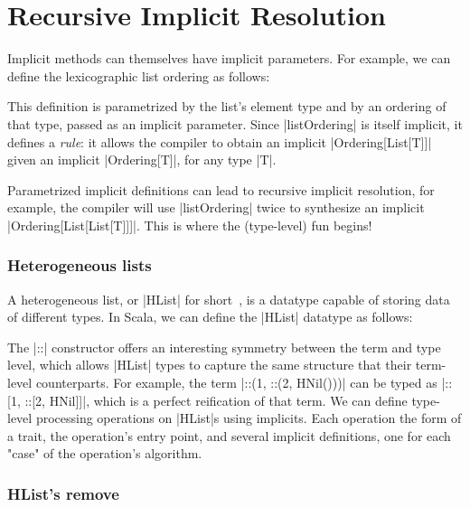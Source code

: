 \section{Recursive Implicit Resolution}

Implicit methods can themselves have implicit parameters.
For example, we can define the lexicographic list ordering as follows:

\ordListExample

\noindent
This definition is parametrized by the list's element type and by an ordering of that type, passed as an implicit parameter.
Since |listOrdering| is itself implicit, it defines a \emph{rule}: it allows the compiler to obtain an implicit |Ordering[List[T]]| given an implicit |Ordering[T]|, for any type |T|.

Parametrized implicit definitions can lead to recursive implicit resolution, for example, the compiler will use |listOrdering| twice to synthesize an implicit |Ordering[List[List[T]]]|.
This is where the (type-level) fun begins!

\subsubsection{Heterogeneous lists}

A heterogeneous list, or |HList| for short~\citep{kiselyov2004strongly}, is a datatype capable of storing data of different types.
In Scala, we can define the |HList| datatype as follows:

\hlistEnumDefinition


\noindent
The |::| constructor offers an interesting symmetry between the term and type level, which allows |HList| types to capture the same structure that their term-level counterparts.
For example, the term |::(1, ::(2, HNil()))| can be typed as |::[1, ::[2, HNil]]|, which is a perfect reification of that term\footnotemark.
We can define type-level processing operations on |HList|s using implicits.
Each operation the form of a trait, the operation's entry point, and several implicit definitions, one for each "case" of the operation's algorithm.


\subsubsection{HList's remove}

